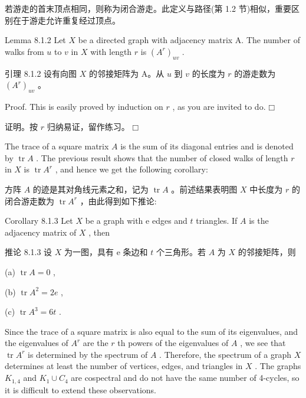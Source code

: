 \documentclass[10pt]{article}
\begin{document}
\begin{tcolorbox}\relax
若游走的首末顶点相同，则称为闭合游走。此定义与路径(第 1.2 节)相似，重要区别在于游走允许重复经过顶点。
\end{tcolorbox}

Lemma 8.1.2 Let \(X\) be a directed graph with adjacency matrix A. The number of walks from \(u\) to \(v\) in \(X\) with length \(r\) is \({\left( {A}^{r}\right) }_{uv}\) .

\begin{tcolorbox}\relax
引理 8.1.2 设有向图 \(X\) 的邻接矩阵为 A。从 \(u\) 到 \(v\) 的长度为 \(r\) 的游走数为 \({\left( {A}^{r}\right) }_{uv}\) 。
\end{tcolorbox}

Proof. This is easily proved by induction on \(r\) , as you are invited to do. \(□\)

\begin{tcolorbox}\relax
证明。按 \(r\) 归纳易证，留作练习。 \(□\)
\end{tcolorbox}

The trace of a square matrix \(A\) is the sum of its diagonal entries and is denoted by \(\operatorname{tr}A\) . The previous result shows that the number of closed walks of length \(r\) in \(X\) is \(\operatorname{tr}{A}^{r}\) , and hence we get the following corollary:

\begin{tcolorbox}\relax
方阵 \(A\) 的迹是其对角线元素之和，记为 \(\operatorname{tr}A\) 。前述结果表明图 \(X\) 中长度为 \(r\) 的闭合游走数为 \(\operatorname{tr}{A}^{r}\) ，由此得到如下推论:
\end{tcolorbox}

Corollary 8.1.3 Let \(X\) be a graph with e edges and \(t\) triangles. If \(A\) is the adjacency matrix of \(X\) , then

\begin{tcolorbox}\relax
推论 8.1.3 设 \(X\) 为一图，具有 e 条边和 \(t\) 个三角形。若 \(A\) 为 \(X\) 的邻接矩阵，则
\end{tcolorbox}

(a) \(\operatorname{tr}A = 0\) ,

(b) \(\operatorname{tr}{A}^{2} = {2e}\) ,

(c) \(\operatorname{tr}{A}^{3} = {6t}\) .

Since the trace of a square matrix is also equal to the sum of its eigenvalues, and the eigenvalues of \({A}^{r}\) are the \(r\) th powers of the eigenvalues of \(A\) , we see that \(\operatorname{tr}{A}^{r}\) is determined by the spectrum of \(A\) . Therefore, the spectrum of a graph \(X\) determines at least the number of vertices, edges, and triangles in \(X\) . The graphs \({K}_{1,4}\) and \({K}_{1} \cup  {C}_{4}\) are cospectral and do not have the same number of 4-cycles, so it is difficult to extend these observations.
\end{document}
